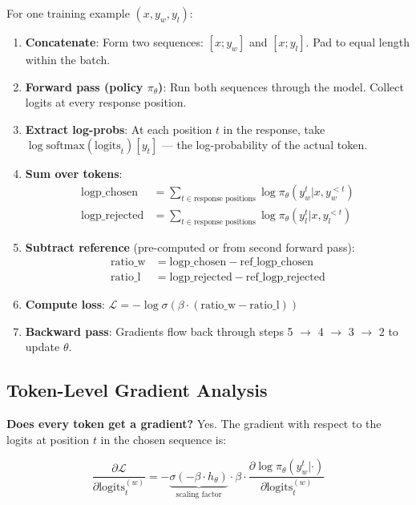 For one training example $(x, y_w, y_l)$:

\begin{enumerate}
  \item \textbf{Concatenate}: Form two sequences: $[x; y_w]$ and $[x; y_l]$. Pad to equal length within the batch.
  \item \textbf{Forward pass (policy $\pi_\theta$)}: Run both sequences through the model. Collect logits at every response position.
  \item \textbf{Extract log-probs}: At each position $t$ in the response, take $\log\text{softmax}(\text{logits}_t)[y_t]$ --- the log-probability of the actual token.
  \item \textbf{Sum over tokens}: 
\begin{align}
\text{logp\_chosen} &= \sum_{t \in \text{response positions}} \log\pi_\theta(y_w^t | x, y_w^{<t}) \\
\text{logp\_rejected} &= \sum_{t \in \text{response positions}} \log\pi_\theta(y_l^t | x, y_l^{<t})
\end{align}
  \item \textbf{Subtract reference} (pre-computed or from second forward pass): 
\begin{align}
\text{ratio\_w} &= \text{logp\_chosen} - \text{ref\_logp\_chosen} \\
\text{ratio\_l} &= \text{logp\_rejected} - \text{ref\_logp\_rejected}
\end{align}
  \item \textbf{Compute loss}: $\mathcal{L} = -\log\sigma(\beta \cdot (\text{ratio\_w} - \text{ratio\_l}))$
  \item \textbf{Backward pass}: Gradients flow back through steps 5 $\rightarrow$ 4 $\rightarrow$ 3 $\rightarrow$ 2 to update $\theta$.
\end{enumerate}

\subsection{Token-Level Gradient Analysis}
\label{token-level-gradient-analysis}

\textbf{Does every token get a gradient?} Yes. The gradient with respect to the logits at position $t$ in the chosen sequence is:

\begin{equation}
\frac{\partial \mathcal{L}}{\partial \text{logits}_t^{(w)}} = -\underbrace{\sigma(-\beta \cdot h_\theta)}_{\text{scaling factor}} \cdot \beta \cdot \frac{\partial \log\pi_\theta(y_w^t | \cdot)}{\partial \text{logits}_t^{(w)}}
\end{equation}

